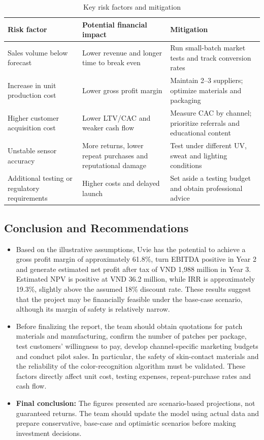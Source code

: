 \begin{table}[ht]
\centering\small
\caption{Key risk factors and mitigation}\label{tab:risk}
\begin{tabular}{@{}L{4.0cm}L{5.0cm}L{5.0cm}@{}}
  \toprule
  \textbf{Risk factor} & \textbf{Potential financial impact} & \textbf{Mitigation}\\
  \midrule
  Sales volume below forecast & Lower revenue and longer time to break even & Run small-batch market tests and track conversion rates\\
  Increase in unit production cost & Lower gross profit margin & Maintain 2--3 suppliers; optimize materials and packaging\\
  Higher customer acquisition cost & Lower LTV/CAC and weaker cash flow & Measure CAC by channel; prioritize referrals and educational content\\
  Unstable sensor accuracy & More returns, lower repeat purchases and reputational damage & Test under different UV, sweat and lighting conditions\\
  Additional testing or regulatory requirements & Higher costs and delayed launch & Set aside a testing budget and obtain professional advice\\
  \bottomrule
\end{tabular}
\end{table}

\subsection{Conclusion and Recommendations}
\begin{itemize}[itemsep=0pt]
  \item Based on the illustrative assumptions, Uvie has the potential to achieve a
    gross profit margin of approximately 61.8\%, turn EBITDA positive in Year 2
    and generate estimated net profit after tax of VND 1,988 million in Year 3.
    Estimated NPV is positive at VND 36.2 million, while IRR is approximately
    19.3\%, slightly above the assumed 18\% discount rate. These results suggest
    that the project may be financially feasible under the base-case scenario,
    although its margin of safety is relatively narrow.
  \item Before finalizing the report, the team should obtain quotations for patch
    materials and manufacturing, confirm the number of patches per package, test
    customers' willingness to pay, develop channel-specific marketing budgets and
    conduct pilot sales. In particular, the safety of skin-contact materials and
    the reliability of the color-recognition algorithm must be validated. These
    factors directly affect unit cost, testing expenses, repeat-purchase rates and
    cash flow.
  \item \textbf{Final conclusion:} The figures presented are scenario-based
    projections, not guaranteed returns. The team should update the model using
    actual data and prepare conservative, base-case and optimistic scenarios
    before making investment decisions.
\end{itemize}
